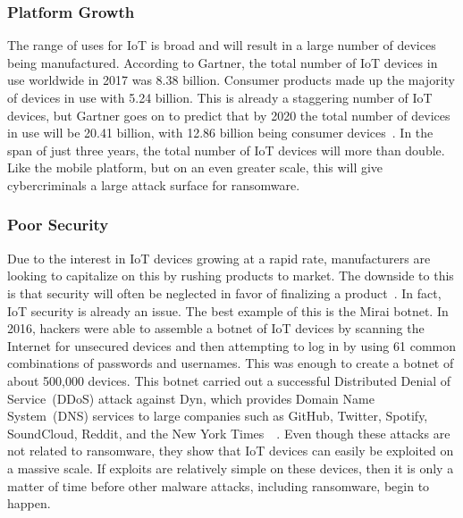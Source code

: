 \documentclass{IEEEtran}
\begin{document}
\subsubsection{Platform Growth}
The range of uses for IoT is broad and will result in a large number of devices being manufactured. According to Gartner, the total number of IoT devices in use worldwide in 2017 was 8.38 billion. Consumer products made up the majority of devices in use with 5.24 billion. This is already a staggering number of IoT devices, but Gartner goes on to predict that by 2020 the total number of devices in use will be 20.41 billion, with 12.86 billion being consumer devices~\cite{RN8}. In the span of just three years, the total number of IoT devices will more than double. Like the mobile platform, but on an even greater scale, this will give cybercriminals a large attack surface for ransomware.
\hfill \break

\subsubsection{Poor Security}
Due to the interest in IoT devices growing at a rapid rate, manufacturers are looking to capitalize on this by rushing products to market. The downside to this is that security will often be neglected in favor of finalizing a product~\cite{RN2}. In fact, IoT security is already an issue. The best example of this is the Mirai botnet. In 2016, hackers were able to assemble a botnet of IoT devices by scanning the Internet for unsecured devices and then attempting to log in by using 61 common combinations of passwords and usernames. This was enough to create a botnet of about 500,000 devices. This botnet carried out a successful Distributed Denial of Service~(DDoS) attack against Dyn, which provides Domain Name System~(DNS) services to large companies such as GitHub, Twitter, Spotify, SoundCloud, Reddit, and the New York Times~\cite{RN5}~\cite{RN6}. Even though these attacks are not related to ransomware, they show that IoT devices can easily be exploited on a massive scale. If exploits are relatively simple on these devices, then it is only a matter of time before other malware attacks, including ransomware, begin to happen.
\hfill \break
\end{document}
